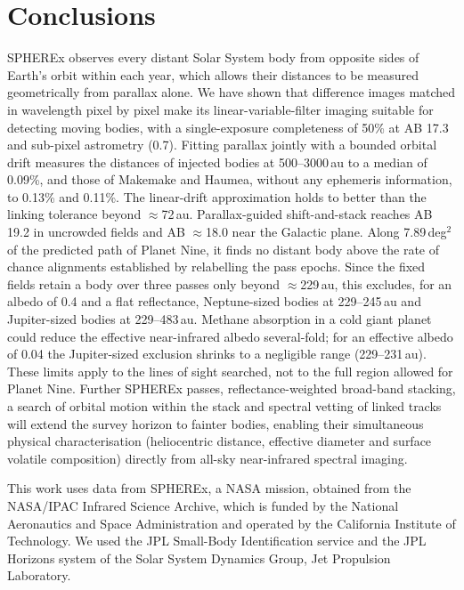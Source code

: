 \documentclass[twocolumn,linenumbers,anonymous]{aastex702}
\begin{document}
\section{Conclusions}\label{sec:conclusions}
SPHEREx observes every distant Solar System body from opposite sides of Earth's orbit within each year, which allows their distances to be measured geometrically from parallax alone. We have shown that difference images matched in wavelength pixel by pixel make its linear-variable-filter imaging suitable for detecting moving bodies, with a single-exposure completeness of 50\% at AB 17.3 and sub-pixel astrometry (0.7\arcsec). Fitting parallax jointly with a bounded orbital drift measures the distances of injected bodies at 500--3000\,au to a median of 0.09\%, and those of Makemake and Haumea, without any ephemeris information, to 0.13\% and 0.11\%. The linear-drift approximation holds to better than the linking tolerance beyond $\approx$72\,au. Parallax-guided shift-and-stack reaches AB 19.2 in uncrowded fields and AB $\approx$18.0 near the Galactic plane. Along 7.89\,deg$^2$ of the predicted path of Planet Nine, it finds no distant body above the rate of chance alignments established by relabelling the pass epochs. Since the fixed fields retain a body over three passes only beyond $\approx$229\,au, this excludes, for an albedo of 0.4 and a flat reflectance, Neptune-sized bodies at 229--245\,au and Jupiter-sized bodies at 229--483\,au. Methane absorption in a cold giant planet could reduce the effective near-infrared albedo several-fold; for an effective albedo of 0.04 the Jupiter-sized exclusion shrinks to a negligible range (229--231\,au). These limits apply to the lines of sight searched, not to the full region allowed for Planet Nine. Further SPHEREx passes, reflectance-weighted broad-band stacking, a search of orbital motion within the stack and spectral vetting of linked tracks will extend the survey horizon to fainter bodies, enabling their simultaneous physical characterisation (heliocentric distance, effective diameter and surface volatile composition) directly from all-sky near-infrared spectral imaging.

\begin{acknowledgments}
This work uses data from SPHEREx, a NASA mission, obtained from the NASA/IPAC Infrared Science Archive, which is funded by the National Aeronautics and Space Administration and operated by the California Institute of Technology. We used the JPL Small-Body Identification service and the JPL Horizons system of the Solar System Dynamics Group, Jet Propulsion Laboratory.
\end{acknowledgments}
\end{document}

